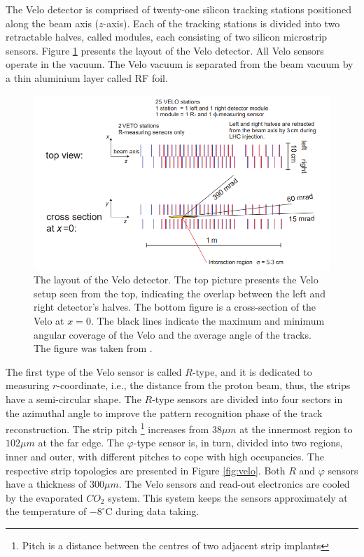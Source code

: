 The Velo detector is comprised of twenty-one silicon tracking stations positioned along the beam axis ($z$-axis). Each of the tracking stations is divided into two retractable halves, called modules, each consisting of two silicon microstrip sensors. Figure \ref{fig:veloLayout} presents the layout of the Velo detector. All Velo sensors operate in the vacuum. The Velo vacuum is separated from the beam vacuum by a thin aluminium layer called RF foil.

\begin{figure}[h]
\centering
\includegraphics{figures/VeloLayout.png}
\caption{The layout of the Velo detector. The top picture presents the Velo setup seen from the top, indicating the overlap between the left and right detector's halves. The bottom figure is a cross-section of the Velo at $x=0$. The black lines indicate the maximum and minimum angular coverage of the Velo and the average angle of the tracks. The figure was taken from \cite{VELO}. 
\label{fig:veloLayout}}
\end{figure}

The first type of the Velo sensor is called $R$-type, and it is dedicated to measuring $r$-coordinate, i.e., the distance from the proton beam, thus, the strips have a semi-circular shape. The $R$-type sensors are divided into four sectors in the azimuthal angle to improve the pattern recognition phase of the track reconstruction. The strip pitch \footnote{Pitch is a distance between the centres of two adjacent strip implants} increases from $38\mu m$ at the innermost region to $102 \mu m$ at the far edge. The $\varphi$-type sensor is, in turn, divided into two regions, inner and outer, with different pitches to cope with high occupancies. The respective strip topologies are presented in Figure \ref{fig:velo}. Both $R$ and $\varphi$ sensors have a thickness of $300 \mu m$. The Velo sensors and read-out electronics are cooled by the evaporated $CO_2$ system. This system keeps the sensors approximately at the temperature of $-8^\circ$C during data taking.  

